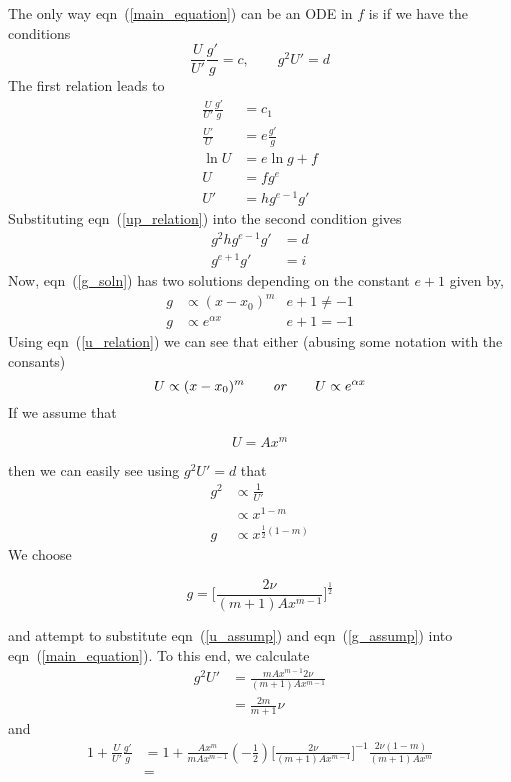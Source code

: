 \documentclass[11pt]{article}
\newcommand{\eqn}[2]{
  \begin{equation}
    \label{#1}
    #2
  \end{equation}
}
\newcommand{\eqr}[1]{eqn~(\ref{#1})}
\begin{document}
\begin{description}
The only way \eqr{main_equation} can be an ODE in $f$ is if we have the conditions
$$
  \frac{U}{U'}\frac{g'}{g} = c,
  \qquad
  g^2 U' = d
$$
The first relation leads to
\begin{align}
\nonumber  \frac{U}{U'}\frac{g'}{g} &= c_1 \\
\nonumber  \frac{U'}{U} &= e \frac{g'}{g} \\
\nonumber  \ln U &= e\ln g + f \\
\label{u_relation}  U &= f g^e \\
\label{up_relation}  U' &= h g^{e-1} g'
\end{align}
Substituting \eqr{up_relation} into the second condition gives
\begin{align}
\nonumber  g^2 h g^{e-1} g' &= d \\
\label{g_soln} g^{e+1} g' &= i
\end{align}
Now, \eqr{g_soln} has two solutions depending on the constant $e+1$ given by,
\begin{align}
\label{g_soln_1} g &\propto (x - x_0)^m & e+1 \neq -1 \\
\label{g_soln_2} g &\propto e^{\alpha x} & e+1 = -1
\end{align}
Using \eqr{u_relation} we can see that either (abusing some notation with the consants)
$$
  U \propto (x - x_0)^m
  \qquad
  \text{\emph{or}}
  \qquad
  U \propto e^{\alpha x}
$$
If we assume that
\eqn{u_assump}{
  U = Ax^m
}
then we can easily see using $g^2 U' = d$ that
\begin{align}
\nonumber g^2 &\propto \frac{1}{U'} \\
\nonumber &\propto x^{1-m} \\
\label{g_propto} g &\propto x^{\frac{1}{2}(1-m)}
\end{align}
We choose
\eqn{g_assump}{
  g
  = 
  \bigg[
  \frac{2\nu}{(m+1)Ax^{m-1}}
  \bigg]^\frac{1}{2}
}
and attempt to substitute \eqr{u_assump} and \eqr{g_assump} into \eqr{main_equation}.
To this end, we calculate
\begin{align}
  \nonumber
  g^2 U'
  &=
  \frac{mAx^{m-1} 2\nu}{(m+1) A x^{m-1}}
  \\
%
%
  \label{second_term}
  &=
  \frac{2m}{m+1}\nu
\end{align}
and
\begin{align}
  \nonumber
  1 + \frac{U}{U'}\frac{g'}{g} 
  &=
  1
  + \frac{Ax^m}{mAx^{m-1}}
  (-\frac{1}{2})
  \bigg[
  \frac{2\nu}{(m+1)Ax^{m-1}}
  \bigg]^{-1}
  \frac{2\nu(1-m)}{(m+1)A x^m}
  \\
%
%
  \nonumber
  &=

\end{align}
\end{description}
\end{document}
